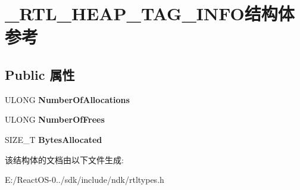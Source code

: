 \hypertarget{struct___r_t_l___h_e_a_p___t_a_g___i_n_f_o}{}\section{\+\_\+\+R\+T\+L\+\_\+\+H\+E\+A\+P\+\_\+\+T\+A\+G\+\_\+\+I\+N\+F\+O结构体 参考}
\label{struct___r_t_l___h_e_a_p___t_a_g___i_n_f_o}
\subsection*{Public 属性}
\begin{DoxyCompactItemize}
\item 
\mbox{\label{struct___r_t_l___h_e_a_p___t_a_g___i_n_f_o_a3b92a7d059edef9ff32258d8e79514fd}} 
U\+L\+O\+NG {\bfseries Number\+Of\+Allocations}
\item 
\mbox{\label{struct___r_t_l___h_e_a_p___t_a_g___i_n_f_o_aad8fbd387cbff7c727fbf8f1460e87de}} 
U\+L\+O\+NG {\bfseries Number\+Of\+Frees}
\item 
\mbox{\label{struct___r_t_l___h_e_a_p___t_a_g___i_n_f_o_ab15e71fea8c6b4dbc73db6050473a60b}} 
S\+I\+Z\+E\+\_\+T {\bfseries Bytes\+Allocated}
\end{DoxyCompactItemize}


该结构体的文档由以下文件生成\+:\begin{DoxyCompactItemize}
\item 
E\+:/\+React\+O\+S-\/0../sdk/include/ndk/rtltypes.\+h\end{DoxyCompactItemize}
